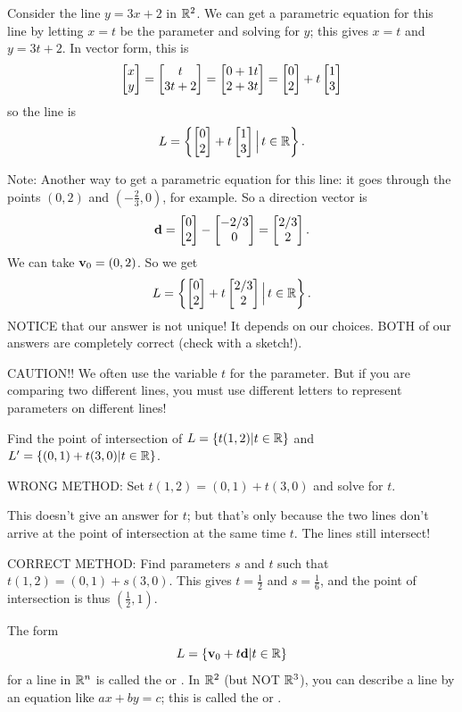 \begin{myexample}
Consider the line $y=3x+2$ in $\mathbb{R}^2$.  We can get a parametric equation for
this line by letting $x=t$ be the parameter and solving for $y$; this gives
$x = t$ and $y=3t+2$.  In vector form, this is
$$
\left[ \begin{matrix} x\\y \end{matrix} \right] = \left[ \begin{matrix} t\\3t+2 \end{matrix} \right] = \left[ \begin{matrix} 0+1t\\2+3t \end{matrix} \right] = \left[ \begin{matrix} 0\\2 \end{matrix} \right] + t\left[ \begin{matrix} 1\\3 \end{matrix} \right]
$$
so the line is
$$
L = \left\{ \left[ \begin{matrix} 0\\2 \end{matrix} \right] + t\left[ \begin{matrix} 1\\3 \end{matrix} \right] \Big| \, t \in \mathbb{R}\right\}.
$$


Note:  Another way to get a parametric equation for this line:  it
 goes through the points $(0,2)$ and $(-\frac{2}{3},0)$,
for example.  So a direction vector is
$$\mathbf{d} = \left[ \begin{matrix} 0\\2 \end{matrix} \right]-\left[ \begin{matrix} -2/3\\0 \end{matrix} \right] = \left[ \begin{matrix} 2/3\\2 \end{matrix} \right].$$
We can take $\mathbf{v}_0 = (0,2)$.  So we get
$$
L = \left\{ \left[ \begin{matrix} 0\\2 \end{matrix} \right] + t\left[ \begin{matrix} 2/3\\2 \end{matrix} \right] \Big|\, t\in\mathbb{R}\right\}.
$$
NOTICE  that our answer is not unique!  It depends on our choices.
BOTH of our answers are completely correct (check with a sketch!).
\end{myexample}

CAUTION!!  We often use the variable $t$ for the parameter.  But if
you are comparing two different lines, you must use different
letters to represent parameters on different lines!

\begin{myexample}
Find the point of intersection of $L = \{ t(1,2) | t \in \mathbb{R}\}$
and $L' = \{ (0,1)+t(3,0) | t \in \mathbb{R}\}$.

WRONG METHOD: Set $t(1,2)=(0,1)+t(3,0)$ and solve for $t$.

This doesn't give an answer for $t$; but that's only because
the two lines don't arrive at the point of intersection at
the same time $t$.  The lines still intersect!

CORRECT METHOD:  Find parameters $s$ and $t$ such that
 $t(1,2) = (0,1)+s(3,0)$.  This gives $t=\frac12$ and $s=\frac16$,
and the point of intersection is thus $(\frac12,1)$.
\end{myexample}

The form
$$
L = \{ \mathbf{v}_0 + t \mathbf{d} | t\in \mathbb{R}\}
$$
for a line in $\mathbb{R}^n$ is called the  or .  In $\mathbb{R}^2$ (but NOT $\mathbb{R}^3$), you can describe a line by an equation like
$ax+by=c$; this is called the  or .

